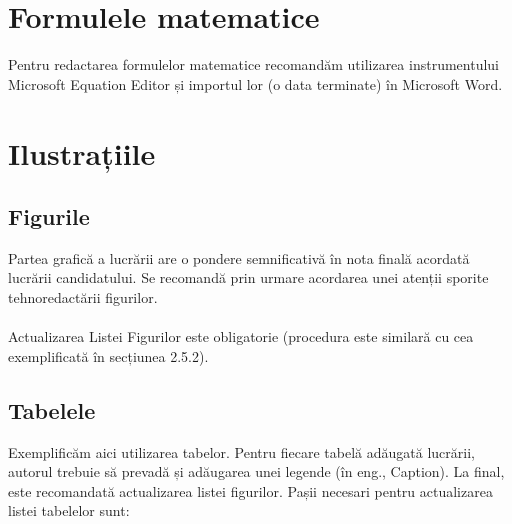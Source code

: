 \section{Formulele matematice}

Pentru redactarea formulelor matematice recomandăm utilizarea instrumentului Microsoft 
Equation Editor și importul lor (o data terminate) în Microsoft Word.

\section{Ilustrațiile}

\subsection{Figurile}

Partea grafică a lucrării are o pondere semnificativă în nota finală acordată lucrării 
candidatului. Se recomandă prin urmare acordarea unei atenții sporite tehnoredactării figurilor.\\~\\
Actualizarea Listei Figurilor este obligatorie (procedura este similară cu cea exemplificată în secțiunea 2.5.2).

\subsection{Tabelele}

Exemplificăm aici utilizarea tabelor. Pentru fiecare tabelă adăugată lucrării, autorul trebuie să prevadă și adăugarea 
unei legende (în eng., Caption).  La final, este recomandată actualizarea listei figurilor. Pașii necesari pentru actualizarea 
listei tabelelor sunt:

